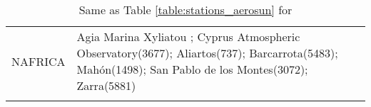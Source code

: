 \documentclass[journal abbreviation, manuscript]{copernicus}
\begin{document}
\begin{table}
\begin{tabularx}{\textwidth}{lX}
  NAFRICA &                                                                                                                                                                                                                                                                                                                                                                                                                                                                                                                                                                                                                                                                                                                                                                                                                                                                                                                                                                                                                                                                                                                                                                                                                                                                                                                                                                                                                                                                                                                                                                                                                                                                                                                                                                                                                                                                                                                                                                                                                                                                                                                                                                                                                                                                                                                                                                                                                                                                                                                                                                                                                                                                                                                                                                                               Agia Marina Xyliatou ; Cyprus Atmospheric Observatory(3677); Aliartos(737); Barcarrota(5483); Mahón(1498); San Pablo de los Montes(3072); Zarra(5881) \\
\bottomhline
 \end{tabularx}
 \caption{Same as Table \ref{table:stations_aerosun} for }
 \label{table:stations_pm25}
\end{table}
\end{document}
